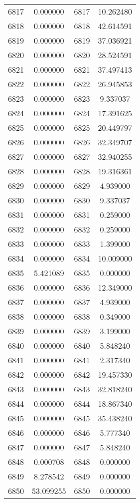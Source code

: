 \documentclass[12pt]{article}
\begin{document}
\begin{longtable}{@{}cccc@{}}
6817 & 0.000000 & 6817 & 10.262480 \\
6818 & 0.000000 & 6818 & 42.614591 \\
6819 & 0.000000 & 6819 & 37.036921 \\
6820 & 0.000000 & 6820 & 28.524591 \\
6821 & 0.000000 & 6821 & 37.497413 \\
6822 & 0.000000 & 6822 & 26.945853 \\
6823 & 0.000000 & 6823 & 9.337037 \\
6824 & 0.000000 & 6824 & 17.391625 \\
6825 & 0.000000 & 6825 & 20.449797 \\
6826 & 0.000000 & 6826 & 32.349707 \\
6827 & 0.000000 & 6827 & 32.940255 \\
6828 & 0.000000 & 6828 & 19.316361 \\
6829 & 0.000000 & 6829 & 4.939000 \\
6830 & 0.000000 & 6830 & 9.337037 \\
6831 & 0.000000 & 6831 & 0.259000 \\
6832 & 0.000000 & 6832 & 0.259000 \\
6833 & 0.000000 & 6833 & 1.399000 \\
6834 & 0.000000 & 6834 & 10.009000 \\
6835 & 5.421089 & 6835 & 0.000000 \\
6836 & 0.000000 & 6836 & 12.349000 \\
6837 & 0.000000 & 6837 & 4.939000 \\
6838 & 0.000000 & 6838 & 0.349000 \\
6839 & 0.000000 & 6839 & 3.199000 \\
6840 & 0.000000 & 6840 & 5.848240 \\
6841 & 0.000000 & 6841 & 2.317340 \\
6842 & 0.000000 & 6842 & 19.457330 \\
6843 & 0.000000 & 6843 & 32.818240 \\
6844 & 0.000000 & 6844 & 18.867340 \\
6845 & 0.000000 & 6845 & 35.438240 \\
6846 & 0.000000 & 6846 & 5.777340 \\
6847 & 0.000000 & 6847 & 5.848240 \\
6848 & 0.000708 & 6848 & 0.000000 \\
6849 & 8.278542 & 6849 & 0.000000 \\
6850 & 53.099255 & 6850 & 0.000000 \\

\end{longtable}
\end{document}
